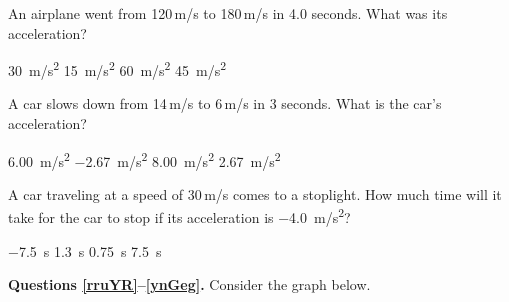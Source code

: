 \documentclass[]{exam}
\begin{document}
\begin{questions}

\question
An airplane went from 120\,m/s to 180\,m/s in 4.0 seconds. What was its acceleration?

\begin{randomizechoices}
    \choice \SI{30}{m/s^2}
    \correctchoice \SI{15}{m/s^2}
    \choice \SI{60}{m/s^2}
    \choice \SI{45}{m/s^2}
\end{randomizechoices}

\question
A car slows down from 14\,m/s to 6\,m/s in 3 seconds. What is the car's acceleration?

\begin{randomizechoices}
    \choice \SI{6.00}{m/s^2}
    \correctchoice \SI{-2.67}{m/s^2}
    \choice \SI{8.00}{m/s^2}
    \choice \SI{2.67}{m/s^2}
\end{randomizechoices}

\question
A car traveling at a speed of 30\,m/s comes to a stoplight.  How much time will it take for the car to stop if its
acceleration is \SI{-4.0}{m/s^2}?

\begin{randomizechoices}
    \choice \SI{-7.5}{s}
    \choice \SI{1.3}{s}
    \choice \SI{0.75}{s}
    \correctchoice \SI{7.5}{s}
\end{randomizechoices}

\begin{EnvUplevel}
    \textbf{Questions \ref{rruYR}--\ref{ynGeg}.} Consider the graph below.
\end{EnvUplevel}

\begin{center}
\end{center}


\end{questions}
\end{document}
